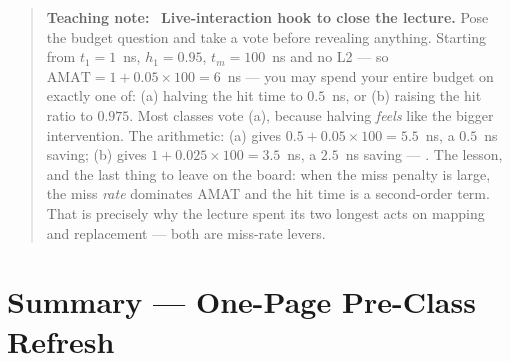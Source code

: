\documentclass[11pt]{article}
\newenvironment{teachingaside}{\begin{quote}\small\color{primary-gold}\textbf{Teaching note:}\ }{\end{quote}}
\begin{document}
\begin{teachingaside}
\textbf{Live-interaction hook to close the lecture.} Pose the budget question and take a vote before revealing anything. Starting from $t_1 = 1$~ns, $h_1 = 0.95$, $t_m = 100$~ns and no L2 --- so $\text{AMAT} = 1 + 0.05\times100 = 6$~ns --- you may spend your entire budget on exactly one of: (a) halving the hit time to $0.5$~ns, or (b) raising the hit ratio to $0.975$. Most classes vote (a), because halving \emph{feels} like the bigger intervention. The arithmetic: (a) gives $0.5 + 0.05\times100 = 5.5$~ns, a $0.5$~ns saving; (b) gives $1 + 0.025\times100 = 3.5$~ns, a $2.5$~ns saving --- . The lesson, and the last thing to leave on the board: when the miss penalty is large, the miss \emph{rate} dominates AMAT and the hit time is a second-order term. That is precisely why the lecture spent its two longest acts on mapping and replacement --- both are miss-rate levers.
\end{teachingaside}

\section{Summary --- One-Page Pre-Class Refresh}
\end{document}

